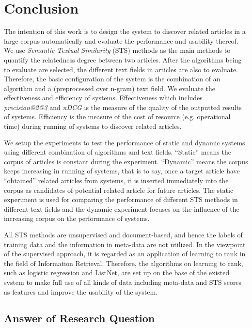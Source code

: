 \section{Conclusion}

The intention of this work is to design the system to discover related articles in a large corpus automatically and evaluate the performance and usability thereof. We use \textit{Semantic Textual Similarity} (STS) methods as the main methods to quantify the relatedness degree between two articles. After the algorithms being to evaluate are selected, the different text fields in articles are also to evaluate. Therefore, the basic configuration of the system is the combination of an algorithm and a (preprocessed over n-gram) text field. We evaluate the effectiveness and efficiency of systems. Effectiveness which includes \textit{precision@2@3} and \textit{nDCG} is the measure of the quality of the outputted results of systems. Efficiency is the measure of the cost of resource (e.g. operational time) during running of systems to discover related articles. 

We setup the experiments to test the performance of static and dynamic systems using different combination of algorithms and text fields. ``Static'' means the corpus of articles is constant during the experiment. ``Dynamic'' means the corpus keeps increasing in running of systems, that is to say, once a target article have ``obtained'' related articles from systems, it is inserted immediately into the corpus as candidates of potential related article for future articles. The static experiment is used for comparing the performance of different STS methods in different text fields and the dynamic experiment focuses on the influence of the increasing corpus on the performance of systems. 

All STS methods are unsupervised and document-based, and hence the labels of training data and the information in meta-data are not utilized. In the viewpoint of the supervised approach, it is regarded as an application of learning to rank in the field of Information Retrieval. Therefore, the algorithms on learning to rank, such as logistic regression and ListNet, are set up on the base of the existed system to make full use of all kinds of data including meta-data and STS scores as features and improve the usability of the system.


\subsection{Answer of Research Question}


